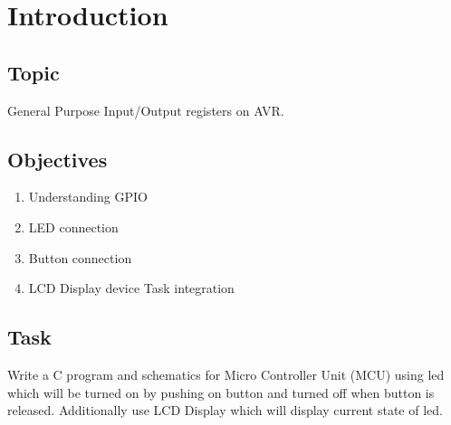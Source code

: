 \section*{\center Introduction}


\subsection*{Topic}
General Purpose Input/Output registers on AVR.


\subsection*{Objectives}
\begin{enumerate}
	\item Understanding GPIO 
    \item LED connection
    \item Button connection
    \item LCD Display device Task integration
\end{enumerate}


\subsection*{Task}
Write  a C program and schematics for Micro Controller Unit (MCU) using led which will be turned on by pushing on button and turned off when button is released. 
Additionally use LCD Display which will display current state of led.


